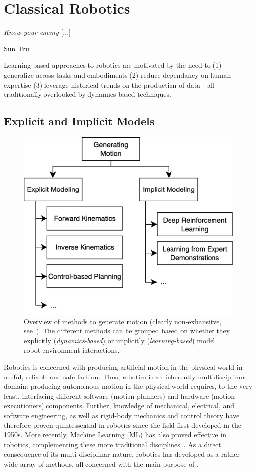 \section{Classical Robotics}
\label{sec:classical}

\epigraph{\textit{Know your enemy} [...]}{Sun Tzu}

\begin{tldr}
Learning-based approaches to robotics are motivated by the need to (1) generalize across tasks and embodiments (2) reduce dependancy on human expertise (3) leverage historical trends on the production of data---all traditionally overlooked by dynamics-based techniques.
\end{tldr}

\subsection{Explicit and Implicit Models}

\begin{figure}
    \centering
    \includegraphics[width=0.5\linewidth]{figures/ch2/ch2-approaches.png}
    \caption{Overview of methods to generate motion (clearly non-exhausitve, see~\citet{bekrisStateRobotMotion2024}). The different methods can be grouped based on whether they explicitly (\emph{dynamics-based}) or implicitly (\emph{learning-based}) model robot-environment interactions.}
    \label{fig:generating-motion-atlas}
\end{figure}

Robotics is concerned with producing artificial motion in the physical world in useful, reliable and safe fashion.
Thus, robotics is an inherently multidisciplinar domain: producing autonomous motion in the physical world requires, to the very least, interfacing different software (motion planners) and hardware (motion executioners) components.
Further, knowledge of mechanical, electrical, and software engineering, as well as rigid-body mechanics and control theory have therefore proven quintessential in robotics since the field first developed in the 1950s.
More recently, Machine Learning (ML) has also proved effective in robotics, complementing these more traditional disciplines~\citep{connellRobotLearning1993}.
As a direct consequence of its multi-disciplinar nature, robotics has developed as a rather wide array of methods, all concerned with the main purpose of .

